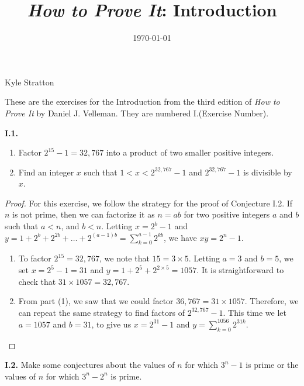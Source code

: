 \documentclass[12pt]{amsart}
\title{\emph{How to Prove It}: Introduction} %
\date{\today}
\newenvironment{statement}[1]{\smallskip\noindent\color[rgb]{.6627, .3529, .6314} {\bf #1.}}{}
\theoremstyle{definition}
\theoremstyle{remark}
\begin{document}
\maketitle

\vspace*{-0.25in}
\centerline{Kyle Stratton}

\begin{framed}
These are the exercises for the Introduction from the third edition of \emph{How to Prove It} by Daniel J. Velleman.
They are numbered I.(Exercise Number).
\end{framed}

\begin{statement}{I.1}
\begin{enumerate}
	\item Factor $2^{15} - 1 = 32,767$ into a product of two smaller positive integers.
	\item Find an integer $x$ such that $1 < x < 2^{32,767} - 1$ and $2^{32,767} - 1$ is divisible by $x$.
\end{enumerate}
\end{statement}

\begin{proof}
For this exercise, we follow the strategy for the proof of Conjecture I.2.
If $n$ is not prime, then we can factorize it as $n = ab$ for two positive integers $a$ and $b$ such that $a < n$, and $b < n$.
Letting $x = 2^b - 1$ and $y = 1 + 2^b + 2^{2b} + \dots + 2^{(a - 1)b} = \sum_{k = 0}^{a - 1} 2^{kb}$, we have $xy = 2^n - 1$.
\begin{enumerate}
	\item To factor $2^{15} = 32,767$, we note that $15 = 3 \times 5$.
	Letting $a = 3$ and $b = 5$, we set $x = 2^5 - 1 = 31$ and $y = 1 + 2^5 + 2^{2 \times 5} = 1057$.
	It is straightforward to check that $31 \times 1057 = 32,767$.
	
	\item From part (1), we saw that we could factor $36,767 = 31 \times 1057$.
	Therefore, we can repeat the same strategy to find factors of $2^{32,767} - 1$.
	This time we let $a = 1057$ and $b = 31$, to give us $x = 2^{31} - 1$ and $y = \sum_{k = 0}^{1056} 2^{31k}$.
\end{enumerate}
\end{proof}


\begin{statement}{I.2}
Make some conjectures about the values of $n$ for which $3^n - 1$ is prime or the values of $n$ for which $3^n - 2^n$ is prime.
\end{statement}
\end{document}
